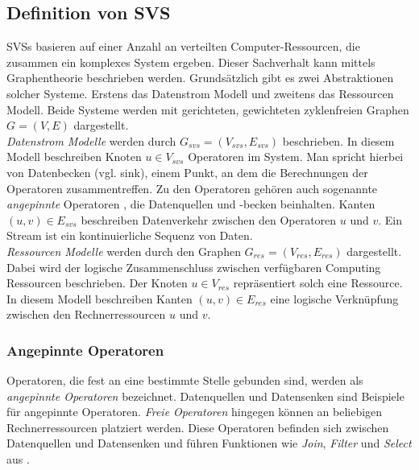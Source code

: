 \documentclass{article}
\begin{document}
\subsection{Definition von SVS}  \label{SVS-Definition}  %
SVSs basieren auf einer Anzahl an verteilten Computer-Ressourcen, die zusammen ein komplexes System ergeben. 
Dieser Sachverhalt kann mittels Graphentheorie beschrieben werden. Grundsätzlich gibt es zwei Abstraktionen solcher Systeme. 
Erstens das Datenstrom Modell und zweitens das Ressourcen Modell. 
Beide Systeme werden mit gerichteten, gewichteten zyklenfreien Graphen $G = (V,E)$ dargestellt. \\


\textit{Datenstrom Modelle} werden durch $G_{svs} = (V_{svs}, E_{svs})$ beschrieben. 
In diesem Modell beschreiben Knoten $u \in V_{svs}$ Operatoren im System. 
Man spricht hierbei von Datenbecken (vgl. sink), einem Punkt, an dem die Berechnungen der Operatoren zusammentreffen. 
Zu den Operatoren gehören auch sogenannte \textit{angepinnte} Operatoren \cite{efficient-operator-placement}, 
die Datenquellen und -becken beinhalten. Kanten $(u,v) \in E_{svs}$ beschreiben Datenverkehr
zwischen den Operatoren $u$ und $v$.  Ein Stream ist ein kontinuierliche Sequenz von Daten. \\


\textit{Ressourcen Modelle} werden durch den Graphen $G_{res} = (V_{res}, E_{res})$ dargestellt. 
Dabei wird der logische Zusammenschluss zwischen verfügbaren Computing Ressourcen beschrieben. Der Knoten $u \in V_{res}$ 
repräsentiert solch eine Ressource. In diesem Modell beschreiben Kanten $(u,v) \in E_{res}$ 
eine logische Verknüpfung zwischen den Rechnerressourcen $u$ und $v$.


\subsubsection{Angepinnte Operatoren}
Operatoren, die fest an eine bestimmte Stelle gebunden sind, werden als \textit{angepinnte Operatoren} bezeichnet. 
Datenquellen und Datensenken sind Beispiele für angepinnte Operatoren. 
\textit{Freie Operatoren} hingegen können an beliebigen Rechnerressourcen platziert werden. Diese Operatoren befinden sich zwischen Datenquellen und Datensenken und führen 
Funktionen wie \textit{Join}, \textit{Filter} und \textit{Select} aus \cite{network-aware-op}.
\end{document}

